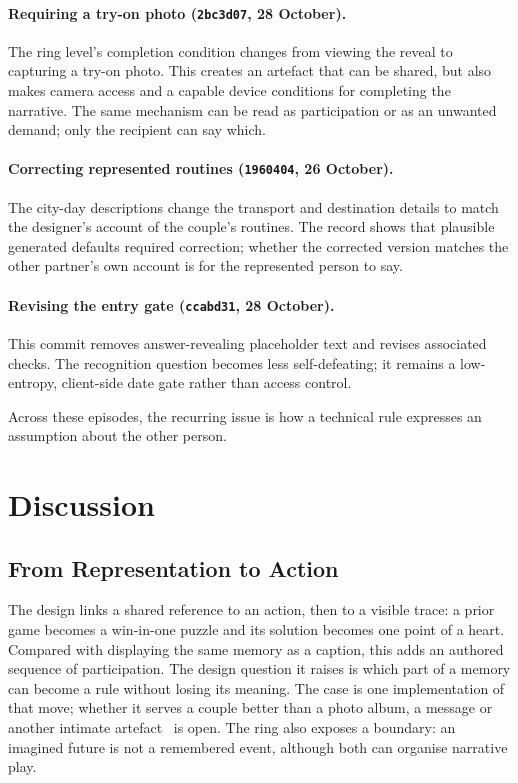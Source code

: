 \documentclass[sigconf,nonacm]{acmart}
\newcommand{\code}[1]{\textnormal{\texttt{\small #1}}}
\begin{document}
\paragraph{Requiring a try-on photo (\code{2bc3d07}, 28 October).}
The ring level's completion condition changes from viewing the reveal to capturing a try-on
photo. This creates an artefact that can be shared, but also makes camera access and a capable
device conditions for completing the narrative. The same mechanism can be read as participation
or as an unwanted demand; only the recipient can say which.

\paragraph{Correcting represented routines (\code{1960404}, 26 October).}
The city-day descriptions change the transport and destination details to match the designer's
account of the couple's routines. The record shows that plausible generated defaults required
correction; whether the corrected version matches the other partner's own account is for the
represented person to say.

\paragraph{Revising the entry gate (\code{ccabd31}, 28 October).}
This commit removes answer-revealing placeholder text and revises associated checks. The
recognition question becomes less self-defeating; it remains a low-entropy, client-side date
gate rather than access control.

Across these episodes, the recurring issue is how a technical rule expresses an assumption
about the other person.


\section{Discussion}\label{sec:discussion}


\subsection{From Representation to Action}
The design links a shared reference to an action, then to a visible trace: a prior game becomes
a win-in-one puzzle and its solution becomes one point of a heart. Compared with displaying the
same memory as a caption, this adds an authored sequence of participation. The design question
it raises is which part of a memory can become a rule without losing its meaning. The case is one
implementation of that move; whether it serves a couple better than a photo album, a message or
another intimate artefact~\cite{hassenzahl2012love,kirk2016ritual} is open.
The ring also exposes a boundary: an imagined future is not a remembered event, although both
can organise narrative play.
\end{document}
